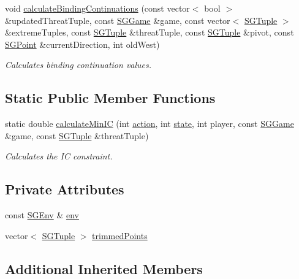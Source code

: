 \begin{DoxyCompactItemize}
void \hyperlink{classSGAction_af0097be42f837e507097036df744f481}{calculate\+Binding\+Continuations} (const vector$<$ bool $>$ \&updated\+Threat\+Tuple, const \hyperlink{classSGGame}{S\+G\+Game} \&game, const vector$<$ \hyperlink{classSGTuple}{S\+G\+Tuple} $>$ \&extreme\+Tuples, const \hyperlink{classSGTuple}{S\+G\+Tuple} \&threat\+Tuple, const \hyperlink{classSGTuple}{S\+G\+Tuple} \&pivot, const \hyperlink{classSGPoint}{S\+G\+Point} \&current\+Direction, int old\+West)
\begin{DoxyCompactList}\small\item\em Calculates binding continuation values. \end{DoxyCompactList}\end{DoxyCompactItemize}
\subsection*{Static Public Member Functions}
\begin{DoxyCompactItemize}
\item 
static double \hyperlink{classSGAction_a9d6073bab90739b098d8653d2eb51c6b}{calculate\+Min\+IC} (int \hyperlink{classSGBaseAction_af293adc10da2dbb5a388a2fbcca0c67c}{action}, int \hyperlink{classSGBaseAction_a2301bf142f93f7d3ddedd44676d10c6a}{state}, int player, const \hyperlink{classSGGame}{S\+G\+Game} \&game, const \hyperlink{classSGTuple}{S\+G\+Tuple} \&threat\+Tuple)
\begin{DoxyCompactList}\small\item\em Calculates the IC constraint. \end{DoxyCompactList}\end{DoxyCompactItemize}
\subsection*{Private Attributes}
\begin{DoxyCompactItemize}
\item 
const \hyperlink{classSGEnv}{S\+G\+Env} \& \hyperlink{classSGAction_a5ae60f6fd5a545d13c8a2525d7378b9d}{env}
\item 
vector$<$ \hyperlink{classSGTuple}{S\+G\+Tuple} $>$ \hyperlink{classSGAction_a55b3b33f432a0a77c89c40438aa2dd1f}{trimmed\+Points}
\end{DoxyCompactItemize}
\subsection*{Additional Inherited Members}



